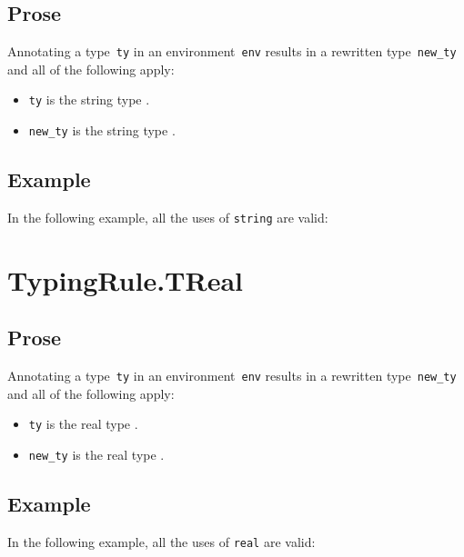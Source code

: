 \documentclass{book}
\begin{document}
\begin{itemize}
\subsection{Prose}
Annotating a type~\texttt{ty} in an environment~\texttt{env} results in a
rewritten type~\texttt{new\_ty} and all of the following apply:
\begin{itemize}
  \item \texttt{ty} is the string type \TString.
  \item \texttt{new\_ty} is the string type \TString.
\end{itemize}

\subsection{Example}
In the following example, all the uses of \texttt{string} are valid:





\section{TypingRule.TReal \label{sec:TypingRule.TReal}}

\subsection{Prose}
Annotating a type~\texttt{ty} in an environment~\texttt{env} results in a
rewritten type~\texttt{new\_ty} and all of the following apply:
\begin{itemize}
  \item \texttt{ty} is the real type \TReal.
  \item \texttt{new\_ty} is the real type \TReal.
\end{itemize}


\subsection{Example}
In the following example, all the uses of \texttt{real} are valid:




\end{itemize}
\end{document}
